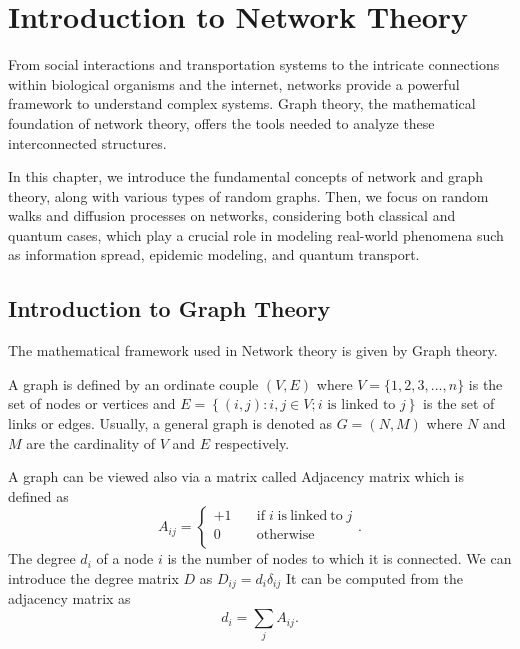 \chapter{Introduction to Network Theory}\label{Network_Theory}

From social interactions and transportation systems to the intricate connections within biological organisms and the internet, networks provide a powerful framework to understand complex systems. Graph theory, the mathematical foundation of network theory, offers the tools needed to analyze these interconnected structures.

In this chapter, we introduce the fundamental concepts of network and graph theory, along with various types of random graphs.
Then, we focus on random walks and diffusion processes on networks, considering both classical and quantum cases, which play a crucial role in modeling real-world phenomena such as information spread, epidemic modeling, and quantum transport.


\section{Introduction to Graph Theory}

The mathematical framework used in Network theory is given by Graph theory. 

A graph is defined by an ordinate couple $(V,E)$ where $V = \{1,2,3, ...,n\}$ is the set of nodes or vertices and $E = \left\{ (i, j): i , j \in V ; i \text{ is linked to } j\right\}$ is the set of links or edges. Usually, a general graph is denoted as $G =(N,M)$ where $N$ and $M$ are the cardinality of $V$ and $E$ respectively.

A graph can be viewed also via a matrix called Adjacency matrix which is defined as
\begin{equation}
    A_{ij}= \left\{ \begin{aligned}
        +1 &\quad \mathrm{if} \; i \; \mathrm{is ~linked ~to} \; j \\
        0 &\quad \mathrm{otherwise} \\
    \end{aligned} \right.  .
\end{equation}
The degree $d_i$ of a node $i$ is the number of nodes to which it is connected. We can introduce the degree matrix $D$ as $D_{ij} = d_i\delta_{ij}$
It can be computed from the adjacency matrix as
\begin{equation}
    d_i = \sum_j A_{ij}.
\end{equation}

